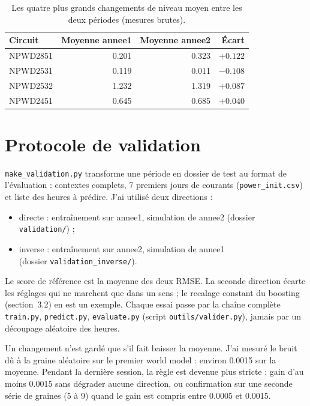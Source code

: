 \documentclass[11pt,a4paper]{article}
\newcommand{\code}[1]{\texttt{#1}}
\begin{document}
\begin{table}[!htb]
\centering\small
\caption{Les quatre plus grands changements de niveau moyen entre les deux périodes (mesures brutes).}
\label{tab:niveaux}
\begin{tabular}{l r r r}
\toprule
Circuit & Moyenne annee1 & Moyenne annee2 & Écart \\
\midrule
NPWD2851 & 0.201 & 0.323 & $+0.122$ \\
NPWD2531 & 0.119 & 0.011 & $-0.108$ \\
NPWD2532 & 1.232 & 1.319 & $+0.087$ \\
NPWD2451 & 0.645 & 0.685 & $+0.040$ \\
\bottomrule
\end{tabular}
\end{table}

\section{Protocole de validation}

\code{make\_validation.py} transforme une période en dossier de test au format de l'évaluation : contextes complets, 7 premiers jours de courants (\code{power\_init.csv}) et liste des heures à prédire. J'ai utilisé deux directions :
\begin{itemize}
  \item directe : entraînement sur annee1, simulation de annee2 (dossier \code{validation/}) ;
  \item inverse : entraînement sur annee2, simulation de annee1\\
  (dossier \code{validation\_inverse/}).
\end{itemize}
Le score de référence est la moyenne des deux RMSE. La seconde direction écarte les réglages qui ne marchent que dans un sens ; le recalage constant du boosting (section~3.2) en est un exemple. Chaque essai passe par la chaîne complète \code{train.py}, \code{predict.py}, \code{evaluate.py} (script \code{outils/valider.py}), jamais par un découpage aléatoire des heures.

Un changement n'est gardé que s'il fait baisser la moyenne. J'ai mesuré le bruit dû à la graine aléatoire sur le premier world model : environ 0.0015 sur la moyenne. Pendant la dernière session, la règle est devenue plus stricte : gain d'au moins 0.0015 sans dégrader aucune direction, ou confirmation sur une seconde série de graines (5 à 9) quand le gain est compris entre 0.0005 et 0.0015.
\end{document}
